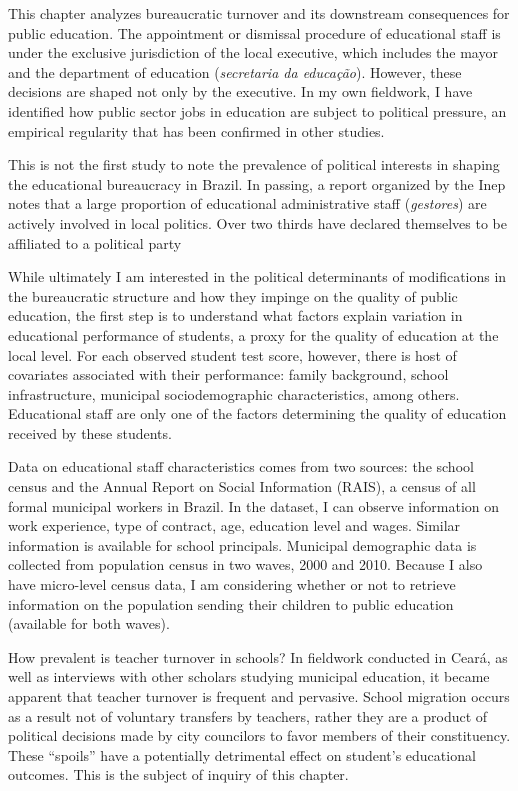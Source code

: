\documentclass[12pt,]{article}
\begin{document}
This chapter analyzes bureaucratic turnover and its downstream
consequences for public education. The appointment or dismissal
procedure of educational staff is under the exclusive jurisdiction of
the local executive, which includes the mayor and the department of
education (\textit{secretaria da educação}). However, these decisions
are shaped not only by the executive. In my own fieldwork, I have
identified how public sector jobs in education are subject to political
pressure, an empirical regularity that has been confirmed in other
studies.

This is not the first study to note the prevalence of political
interests in shaping the educational bureaucracy in Brazil. In passing,
a report organized by the Inep notes that a large proportion of
educational administrative staff (\textit{gestores}) are actively
involved in local politics. Over two thirds have declared themselves to
be affiliated to a political party

While ultimately I am interested in the political determinants of
modifications in the bureaucratic structure and how they impinge on the
quality of public education, the first step is to understand what
factors explain variation in educational performance of students, a
proxy for the quality of education at the local level. For each observed
student test score, however, there is host of covariates associated with
their performance: family background, school infrastructure, municipal
sociodemographic characteristics, among others. Educational staff are
only one of the factors determining the quality of education received by
these students.

Data on educational staff characteristics comes from two sources: the
school census and the Annual Report on Social Information (RAIS), a
census of all formal municipal workers in Brazil. In the dataset, I can
observe information on work experience, type of contract, age, education
level and wages. Similar information is available for school principals.
Municipal demographic data is collected from population census in two
waves, 2000 and 2010. Because I also have micro-level census data, I am
considering whether or not to retrieve information on the population
sending their children to public education (available for both waves).

How prevalent is teacher turnover in schools? In fieldwork conducted in
Ceará, as well as interviews with other scholars studying municipal
education, it became apparent that teacher turnover is frequent and
pervasive. School migration occurs as a result not of voluntary
transfers by teachers, rather they are a product of political decisions
made by city councilors to favor members of their constituency. These
``spoils'' have a potentially detrimental effect on student's
educational outcomes. This is the subject of inquiry of this chapter.
\end{document}
